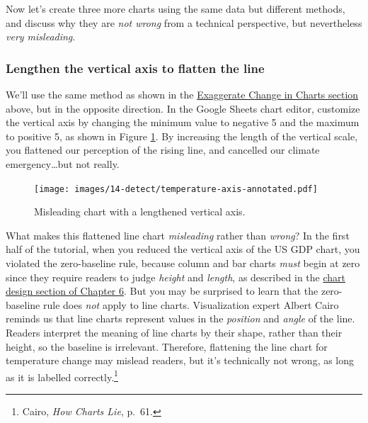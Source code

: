 \documentclass[
  english,
]{book}
\begin{document}
Now let's create three more charts using the same data but different methods, and discuss why they are \emph{not wrong} from a technical perspective, but nevertheless \emph{very misleading}.

\hypertarget{lengthen-the-vertical-axis-to-flatten-the-line}{%
\subsubsection*{Lengthen the vertical axis to flatten the line}\label{lengthen-the-vertical-axis-to-flatten-the-line}}

We'll use the same method as shown in the \href{how-to-lie-with-charts.html}{Exaggerate Change in Charts section} above, but in the opposite direction. In the Google Sheets chart editor, customize the vertical axis by changing the minimum value to negative 5 and the maximum to positive 5, as shown in Figure \ref{fig:temperature-axis-annotated}. By increasing the length of the vertical scale, you flattened our perception of the rising line, and cancelled our climate emergency\ldots but not really.



\begin{figure}
\centering
\texttt{[image: images/14-detect/temperature-axis-annotated.pdf]}
\caption{\label{fig:temperature-axis-annotated}Misleading chart with a lengthened vertical axis.}
\end{figure}

What makes this flattened line chart \emph{misleading} rather than \emph{wrong}? In the first half of the tutorial, when you reduced the vertical axis of the US GDP chart, you violated the zero-baseline rule, because column and bar charts \emph{must} begin at zero since they require readers to judge \emph{height} and \emph{length}, as described in the \href{chart-design.html}{chart design section of Chapter 6}. But you may be surprised to learn that the zero-baseline rule does \emph{not} apply to line charts. Visualization expert Albert Cairo reminds us that line charts represent values in the \emph{position} and \emph{angle} of the line. Readers interpret the meaning of line charts by their shape, rather than their height, so the baseline is irrelevant. Therefore, flattening the line chart for temperature change may mislead readers, but it's technically not wrong, as long as it is labelled correctly.\footnote{Cairo, \emph{How {Charts Lie}}, p.~61.}
\end{document}

